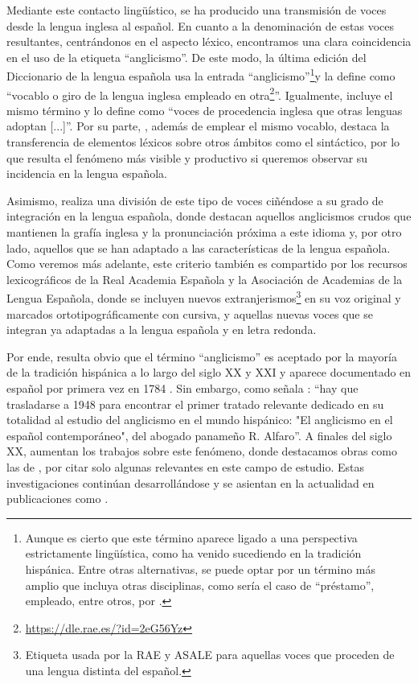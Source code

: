 \documentclass{textolivre}
\begin{document}
Mediante este contacto lingüístico, se ha producido una transmisión de voces desde la lengua inglesa al español. En cuanto a la denominación de estas voces resultantes, centrándonos en el aspecto léxico, encontramos una clara coincidencia en el uso de la etiqueta “anglicismo”. De este modo, la última edición del Diccionario de la lengua española \cite{real2014diccionario} usa la entrada “anglicismo”\footnote{
Aunque es cierto que este término aparece ligado a una perspectiva estrictamente lingüística, como ha venido sucediendo en la tradición hispánica. Entre otras alternativas, se puede optar por un término más amplio que incluya otras disciplinas, como sería el caso de “préstamo”, empleado, entre otros, por \textcite{capuz2009}.
}y la define como “vocablo o giro de la lengua inglesa empleado en otra\footnote{
\url{https://dle.rae.es/?id=2eG56Yz}
}”. Igualmente, \textcite[p. 277]{amador2015} incluye el mismo término y lo define como “voces de procedencia inglesa que otras lenguas adoptan [...]”. Por su parte, \textcite{capuz2000}, además de emplear el mismo vocablo, destaca la transferencia de elementos léxicos sobre otros ámbitos como el sintáctico, por lo que resulta el fenómeno más visible y productivo si queremos observar su incidencia en la lengua española.

Asimismo, \textcite{lorenzo1987} realiza una división de este tipo de voces ciñéndose a su grado de integración en la lengua española, donde destacan aquellos anglicismos crudos que mantienen la grafía inglesa y la pronunciación próxima a este idioma y, por otro lado, aquellos que se han adaptado a las características de la lengua española. Como veremos más adelante, este criterio también es compartido por los recursos lexicográficos de la Real Academia Española y la Asociación de Academias de la Lengua Española, donde se incluyen nuevos extranjerismos\footnote{
Etiqueta usada por la RAE y ASALE para aquellas voces que proceden de una lengua distinta del español.
} en su voz original y marcados ortotipográficamente con cursiva, y aquellas nuevas voces que se integran ya adaptadas a la lengua española y en letra redonda.

Por ende, resulta obvio que el término “anglicismo” es aceptado por la mayoría de la tradición hispánica a lo largo del siglo XX y XXI y aparece documentado en español por primera vez en 1784 \cite[p. 13]{Lorenzo1996}. Sin embargo, como señala \textcite[p. 99]{RodrguezMedina2000}: “hay que trasladarse a 1948 para encontrar el primer tratado relevante dedicado en su totalidad al estudio del anglicismo en el mundo hispánico: "El anglicismo en el español contemporáneo", del abogado panameño R. Alfaro”.  A finales del siglo XX, aumentan los trabajos sobre este fenómeno, donde destacamos obras como las de \textcite{pratt1980,lorenzo1987,Lorenzo1996,medina1996,salavador1994,rodriguez1997,riquelme1998,capuz1998}, por citar solo algunas relevantes en este campo de estudio. Estas investigaciones continúan desarrollándose y se asientan en la actualidad en publicaciones como \textcite{navarro2006,capuz2009,rodriguez2013,rodriguez2017,rodriguez2018,rodriguez2019,amador2014,amador2015,moreno2018,moreno2018b}.
\end{document}
